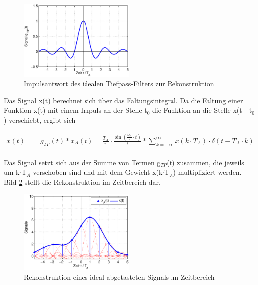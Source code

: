 \begin{figure}[H]
  \centerline{\includegraphics[width=0.5\textwidth]{Kapitel1/Bilder/image8}}
  \caption{Impulsantwort des idealen Tiefpass-Filters zur Rekonstruktion}
  \label{fig:RekonstruktionIdealSignal}
\end{figure}

\noindent Das Signal x(t) berechnet sich über das Faltungsintegral. Da die Faltung einer Funktion x(t) mit einem Impuls an der Stelle t$_{0}$ die Funktion an die Stelle x(t - t$_{0}$) verschiebt, ergibt sich

\begin{equation}\label{eq:twofourteen}
\begin{split}
x\left(t\right) & = g_{TP} \left(t\right)*x_{A} \left(t\right)=\frac{T_{A} }{\pi } \cdot \frac{\sin \left(\frac{\omega _{A} }{2} \cdot t\right)}{t} *\sum _{k=-\infty }^{\infty }x\left(k\cdot T_{A} \right)\cdot \delta \left(t-T_{A} \cdot k\right) \\ {} 
\end{split}
\end{equation}

\noindent Das Signal setzt sich aus der Summe von Termen g$_{TP}$(t) zusammen, die jeweils um k$\cdot$T${}_{A}$ verschoben sind und mit dem Gewicht x(k$\cdot$T${}_{A}$) multipliziert werden. Bild \ref{fig:RekonstruktionIdealSignalimZeit} stellt die Rekonstruktion im Zeitbereich dar.

\begin{figure}[H]
  \centerline{\includegraphics[width=0.5\textwidth]{Kapitel1/Bilder/image9}}
  \caption{Rekonstruktion eines ideal abgetasteten Signals im Zeitbereich}
  \label{fig:RekonstruktionIdealSignalimZeit}
\end{figure}


